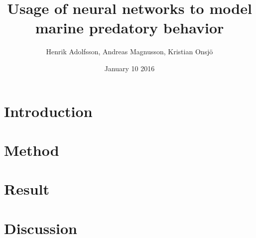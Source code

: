 \documentclass[12pt,A4]{article}
\title{Usage of neural networks to model marine predatory behavior}
\author{Henrik Adolfsson, Andreas Magnusson, Kristian Onsj\"o}
\date{January 10 2016}
\begin{document}
\maketitle
\thispagestyle{empty}

\begin{abstract}

\end{abstract}
\clearpage

\tableofcontents
\thispagestyle{empty}
\clearpage

\setcounter{page}{1}
\section{Introduction}


\section{Method}


\section{Result}


\section{Discussion}






\end{document}
